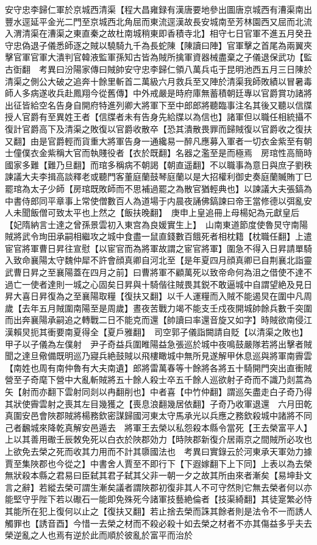 安守忠李歸仁軍於京城西清渠【程大昌雍録有漢唐要地參出圖唐京城西有漕渠南出豐水逕延平金光二門至京城西北角屈而東流逕漢故長安城南至芳林園西又屈而北流入渭清渠在漕渠之東直秦之故杜南城稍東即香積寺北】相守七日官軍不進五月癸丑守忠偽退子儀悉師逐之賊以驍騎九千為長蛇陳【陳讀曰陣】官軍擊之首尾為兩翼夾擊官軍官軍大潰判官韓液監軍孫知古皆為賊所擒軍資器械盡棄之子儀退保武功【監古衘翻　考異曰汾陽家傳曰賊帥安守忠李歸仁領八萬兵屯于昆明池西五月三日陳於清渠之側公大破之追奔十餘里斬首二萬級六月救兵至又陣於清渠我師敗績以冒暑毒師人多病遂收兵赴鳳翔今從舊傳】中外戒嚴是時府庫無蓄積朝廷專以官爵賞功諸將出征皆給空名告身自開府特進列卿大將軍下至中郎郎將聽臨事注名其後又聽以信牒授人官爵有至異姓王者【信牒者未有告身先給牒以為信也】諸軍但以職任相統攝不復計官爵高下及清渠之敗復以官爵收散卒【恐其潰散畏罪而歸賊復以官爵收之復扶又翻】由是官爵輕而貨重大將軍告身一通纔易一醉凡應募入軍者一切衣金紫至有朝士僮僕衣金紫稱大官而執賤役者【衣於既翻】名器之濫至是而極焉　房琯性高簡時國家多難【難乃旦翻】而琯多稱病不朝謁【朝直遥翻】不以職事為意日與庶子劉秩諫議大夫李揖高談釋老或聽門客董庭蘭鼓琴庭蘭以是大招權利御史奏庭蘭贓賄丁巳罷琯為太子少師【房琯既敗師而不思補過罷之為散官猶輕典也】以諫議大夫張鎬為中書侍郎同平章事上常使僧數百人為道場于内晨夜誦佛鎬諫曰帝王當修德以弭亂安人未聞飯僧可致太平也上然之【飯扶晚翻】　庚申上皇追冊上母楊妃為元獻皇后【妃隋納言士達之曾孫景雲初入東宫為良媛實生上】　山南東道節度使魯炅守南陽賊將武令珣田承嗣相繼攻之城中食盡一鼠直錢數百餓死者相枕籍【枕職任翻】上遣宦官將軍曹日昇往宣慰【以宦官而為將軍故謂之宦官將軍】圍急不得入日昇請單騎入致命襄陽太守魏仲犀不許會顔真卿自河北至【是年夏四月顔真卿已自荆襄北詣靈武曹日昇之至襄陽蓋在四月之前】曰曹將軍不顧萬死以致帝命何為沮之借使不達不過亡一使者達則一城之心固矣日昇與十騎偕往賊畏其鋭不敢逼城中自謂望絶及見日昇大喜日昇復為之至襄陽取糧【復扶又翻】以千人運糧而入賊不能遏炅在圍中凡周歲【去年五月賊圍南陽至是周歲】晝夜苦戰力竭不能支壬戍夜開城帥餘兵數千突圍而出奔襄陽承嗣追之轉戰二日不能克而還【帥讀曰率還音旋又如字】時賊欲南侵江漢賴炅扼其衝要南夏得全【夏戶雅翻】　司空郭子儀詣闕請自貶【以清渠之敗也】甲子以子儀為左僕射　尹子奇益兵圍睢陽益急張巡於城中夜鳴鼓嚴隊若將出擊者賊聞之達旦儆備既明巡乃寢兵絶鼓賊以飛樓瞰城中無所見遂解甲休息巡與將軍南霽雲【南姓也周有南仲魯有大夫南遺】郎將雷萬春等十餘將各將五十騎開門突出直衝賊營至子奇麾下營中大亂斬賊將五十餘人殺士卒五千餘人巡欲射子奇而不識乃剡蒿為矢【射而亦翻下雲射同剡以冉翻削也】中者喜【中竹仲翻】謂巡矢盡走白子奇乃得其狀使霽雲射之喪其左目幾獲之【喪息浪翻幾居依翻】子奇乃收軍退還　六月田乾真圍安邑會陜郡賊將楊務欽密謀歸國河東太守馬承光以兵應之務欽殺城中諸將不同己者飜城來降乾真解安邑遁去　將軍王去榮以私怨殺本縣令當死【王去榮富平人】上以其善用礮壬辰敇免死以白衣於陜郡効力【時陜郡新復介居兩京之間賊所必攻也上欲免去榮之死而收其力用而不計其隳國法也　考異曰實錄云於河東承天軍効力據賈至集陜郡也今從之】中書舍人賈至不即行下【下遐嫁翻下上下同】上表以為去榮無狀殺本縣之君易曰臣弑其君子弑其父非一朝一夕之故其所由來者漸矣【易坤卦文言之辭】若縱去榮可謂生漸矣議者謂陜郡初復非其人不可守然則它無去榮者何以亦能堅守乎陛下若以礮石一能即免殊死今諸軍技藝絶倫者【技渠綺翻】其徒寔繁必恃其能所在犯上復何以止之【復扶又翻】若止捨去榮而誅其餘者則是法令不一而誘人觸罪也【誘音酉】今惜一去榮之材而不殺必殺十如去榮之材者不亦其傷益多乎夫去榮逆亂之人也焉有逆於此而順於彼亂於富平而治於